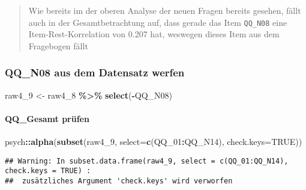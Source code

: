 \documentclass[
]{article}
\newenvironment{Shaded}{\begin{snugshade}}{\end{snugshade}}
\newcommand{\AttributeTok}[1]{\textcolor[rgb]{0.13,0.29,0.53}{#1}}
\newcommand{\ConstantTok}[1]{\textcolor[rgb]{0.56,0.35,0.01}{#1}}
\newcommand{\FunctionTok}[1]{\textcolor[rgb]{0.13,0.29,0.53}{\textbf{#1}}}
\newcommand{\NormalTok}[1]{#1}
\newcommand{\OtherTok}[1]{\textcolor[rgb]{0.56,0.35,0.01}{#1}}
\newcommand{\SpecialCharTok}[1]{\textcolor[rgb]{0.81,0.36,0.00}{\textbf{#1}}}
\begin{document}
\begin{quote}
Wie bereits im der oberen Analyse der neuen Fragen bereits gesehen,
fällt auch in der Gesamtbetrachtung auf, dass gerade das Item
\texttt{QQ\_N08} eine Item-Rest-Korrelation von 0.207 hat, weswegen
dieses Item aus dem Fragebogen fällt
\end{quote}

\subsubsection{QQ\_N08 aus dem Datensatz
werfen}\label{qq_n08-aus-dem-datensatz-werfen}

\begin{Shaded}
\begin{Highlighting}[]
\NormalTok{raw4\_9 }\OtherTok{\textless{}{-}}\NormalTok{ raw4\_8 }\SpecialCharTok{\%\textgreater{}\%} 
  \FunctionTok{select}\NormalTok{(}\SpecialCharTok{{-}}\NormalTok{QQ\_N08)}
\end{Highlighting}
\end{Shaded}

\paragraph{QQ\_Gesamt prüfen}\label{qq_gesamt-pruxfcfen}

\begin{Shaded}
\begin{Highlighting}[]
\NormalTok{psych}\SpecialCharTok{::}\FunctionTok{alpha}\NormalTok{(}\FunctionTok{subset}\NormalTok{(raw4\_9, }\AttributeTok{select=}\FunctionTok{c}\NormalTok{(QQ\_01}\SpecialCharTok{:}\NormalTok{QQ\_N14), }\AttributeTok{check.keys=}\ConstantTok{TRUE}\NormalTok{))}
\end{Highlighting}
\end{Shaded}

\begin{verbatim}
## Warning: In subset.data.frame(raw4_9, select = c(QQ_01:QQ_N14), check.keys = TRUE) :
##  zusätzliches Argument 'check.keys' wird verworfen
\end{verbatim}
\end{document}

